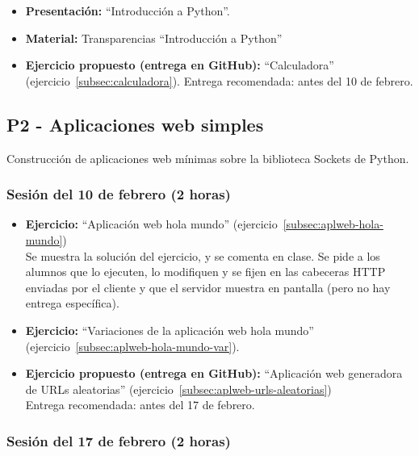 \documentclass[a4paper,12pt]{article}
\begin{document}
\begin{itemize}
\item \textbf{Presentación:} ``Introducción a Python''.
\item \textbf{Material:} Transparencias ``Introducción a Python''
\item \textbf{Ejercicio propuesto (entrega en GitHub):} ``Calculadora'' (ejercicio~\ref{subsec:calculadora}).
   Entrega recomendada: antes del 10 de febrero.

\end{itemize}

\subsection{P2 - Aplicaciones web simples}

Construcción de aplicaciones web mínimas sobre la biblioteca Sockets de Python.

\subsubsection{Sesión del 10 de febrero (2 horas)}

\begin{itemize}
 \item \textbf{Ejercicio:} ``Aplicación web hola mundo'' (ejercicio~\ref{subsec:aplweb-hola-mundo}) \\
   Se muestra la solución del ejercicio, y se comenta en clase. Se pide a los alumnos que lo ejecuten, lo modifiquen y se fijen en las cabeceras HTTP enviadas por el cliente y que el servidor muestra en pantalla (pero no hay entrega específica).
 \item \textbf{Ejercicio:} ``Variaciones de la aplicación web hola mundo'' (ejercicio~\ref{subsec:aplweb-hola-mundo-var}).
 \item \textbf{Ejercicio propuesto (entrega en GitHub):} ``Aplicación web generadora de URLs aleatorias'' (ejercicio~\ref{subsec:aplweb-urls-aleatorias}) \\
   Entrega recomendada: antes del 17 de febrero.
\end{itemize}

\subsubsection{Sesión del 17 de febrero (2 horas)}
\end{document}
